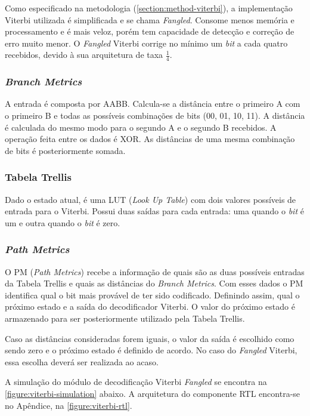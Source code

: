 	Como especificado na metodologia (\autoref{section:method-viterbi}), a implementação Viterbi utilizada é simplificada e se chama \textit{Fangled}. Consome menos memória e processamento e é mais veloz, porém tem capacidade de detecção e correção de erro muito menor. O \textit{Fangled} Viterbi corrige no mínimo um \textit{bit} a cada quatro recebidos, devido à sua arquitetura de taxa $\frac{1}{4}$.

	\subsubsection{\textit{Branch Metrics}}
	A entrada é composta por AABB. Calcula-se a distância entre o primeiro A com o primeiro B e todas as possíveis combinações de bits (00, 01, 10, 11). A distância é calculada do mesmo modo para o segundo A e o segundo B recebidos. A operação feita entre os dados é XOR. As distâncias de uma mesma combinação de bits é posteriormente somada.
	
	\subsubsection{Tabela Trellis}
	Dado o estado atual, é uma LUT (\textit{Look Up Table}) com dois valores possíveis de entrada para o Viterbi. Possui duas saídas para cada entrada: uma quando o \textit{bit} é um e outra quando o \textit{bit} é zero.
	
	\subsubsection{\textit{Path Metrics}}
	O PM (\textit{Path Metrics}) recebe a informação de quais são as duas possíveis entradas da Tabela Trellis e quais as distâncias do \textit{Branch Metrics}. Com esses dados o PM identifica qual o bit mais provável de ter sido codificado. Definindo assim, qual o próximo estado e a saída do decodificador Viterbi. O valor do próximo estado é armazenado para ser posteriormente utilizado pela Tabela Trellis.
	
	Caso as distâncias consideradas forem iguais, o valor da saída é escolhido como sendo zero e o próximo estado é definido de acordo. No caso do \textit{Fangled} Viterbi, essa escolha deverá ser realizada ao acaso.
	
	A simulação do módulo de decodificação Viterbi \textit{Fangled} se encontra na \autoref{figure:viterbi-simulation} abaixo. A arquitetura do componente RTL encontra-se no Apêndice, na \autoref{figure:viterbi-rtl}.
	
